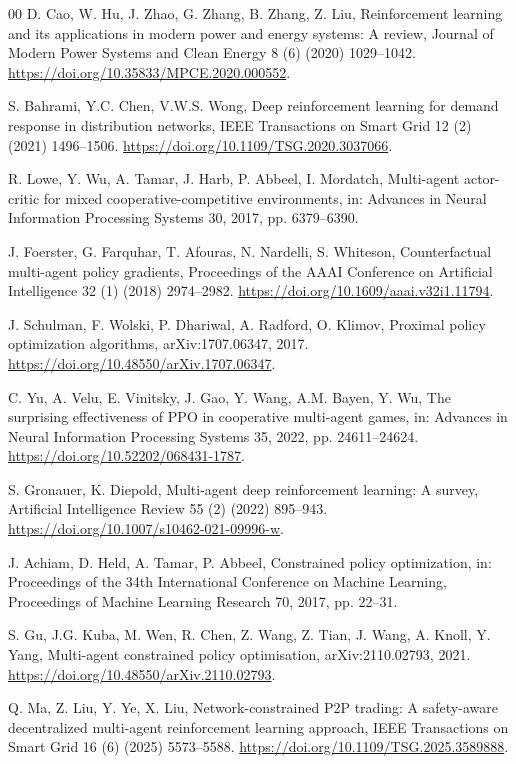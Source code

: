 \documentclass[final,5p,times]{elsarticle}
\begin{document}
\begin{thebibliography}{00}
D. Cao, W. Hu, J. Zhao, G. Zhang, B. Zhang, Z. Liu, Reinforcement learning and its applications in modern power and energy systems: A review, Journal of Modern Power Systems and Clean Energy 8 (6) (2020) 1029--1042. \url{https://doi.org/10.35833/MPCE.2020.000552}.

S. Bahrami, Y.C. Chen, V.W.S. Wong, Deep reinforcement learning for demand response in distribution networks, IEEE Transactions on Smart Grid 12 (2) (2021) 1496--1506. \url{https://doi.org/10.1109/TSG.2020.3037066}.

R. Lowe, Y. Wu, A. Tamar, J. Harb, P. Abbeel, I. Mordatch, Multi-agent actor-critic for mixed cooperative-competitive environments, in: Advances in Neural Information Processing Systems 30, 2017, pp. 6379--6390.

J. Foerster, G. Farquhar, T. Afouras, N. Nardelli, S. Whiteson, Counterfactual multi-agent policy gradients, Proceedings of the AAAI Conference on Artificial Intelligence 32 (1) (2018) 2974--2982. \url{https://doi.org/10.1609/aaai.v32i1.11794}.

J. Schulman, F. Wolski, P. Dhariwal, A. Radford, O. Klimov, Proximal policy optimization algorithms, arXiv:1707.06347, 2017. \url{https://doi.org/10.48550/arXiv.1707.06347}.

C. Yu, A. Velu, E. Vinitsky, J. Gao, Y. Wang, A.M. Bayen, Y. Wu, The surprising effectiveness of PPO in cooperative multi-agent games, in: Advances in Neural Information Processing Systems 35, 2022, pp. 24611--24624. \url{https://doi.org/10.52202/068431-1787}.

S. Gronauer, K. Diepold, Multi-agent deep reinforcement learning: A survey, Artificial Intelligence Review 55 (2) (2022) 895--943. \url{https://doi.org/10.1007/s10462-021-09996-w}.

J. Achiam, D. Held, A. Tamar, P. Abbeel, Constrained policy optimization, in: Proceedings of the 34th International Conference on Machine Learning, Proceedings of Machine Learning Research 70, 2017, pp. 22--31.

S. Gu, J.G. Kuba, M. Wen, R. Chen, Z. Wang, Z. Tian, J. Wang, A. Knoll, Y. Yang, Multi-agent constrained policy optimisation, arXiv:2110.02793, 2021. \url{https://doi.org/10.48550/arXiv.2110.02793}.

Q. Ma, Z. Liu, Y. Ye, X. Liu, Network-constrained P2P trading: A safety-aware decentralized multi-agent reinforcement learning approach, IEEE Transactions on Smart Grid 16 (6) (2025) 5573--5588. \url{https://doi.org/10.1109/TSG.2025.3589888}.


\end{thebibliography}
\end{document}
